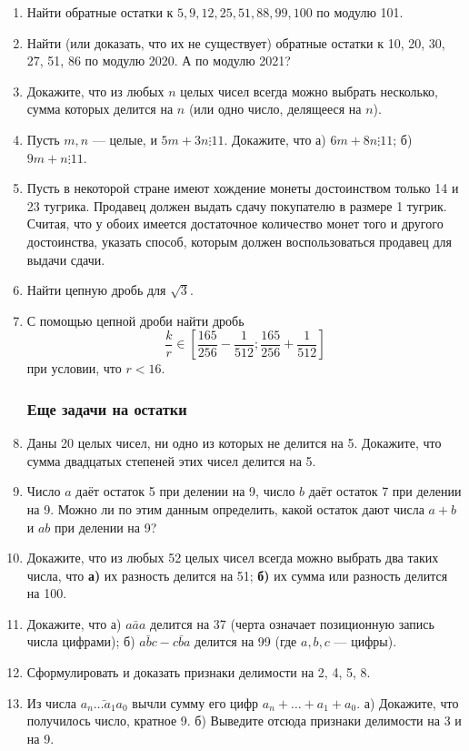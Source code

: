 \begin{enumerate}
\item Найти обратные остатки к $5,9,12,25,51,88,99,100$ по модулю 101.
\item Найти (или доказать, что их не существует) обратные остатки к 10, 20, 30, 27, 51, 86 по модулю 2020. А по модулю 2021?
\item Докажите, что из любых $n$ целых чисел всегда можно выбрать
несколько, сумма которых делится на $n$ (или одно число, делящееся
на $n$).
\item Пусть $m,n$ --- целые, и $5m+3n\vdots 11$. Докажите, что а) $6m+8n\vdots 11$; б) $9m+n\vdots 11$.
\item Пусть в некоторой стране имеют хождение монеты достоинством только 14 и 23 тугрика. Продавец должен выдать сдачу покупателю в размере 1 тугрик. Считая, что у обоих имеется достаточное количество монет того и другого достоинства, указать способ, которым должен воспользоваться продавец для выдачи сдачи.
\item Найти цепную дробь для $\sqrt 3$.

\item С помощью цепной дроби найти дробь
$$
\frac{k}{r} \in \left[\frac{165}{256}-\frac{1}{512};\frac{165}{256}+\frac{1}{512}\right]
$$
при условии, что $r<16$.

\subsubsection*{Еще задачи на остатки}
\item Даны 20 целых чисел, ни одно из которых не делится на 5. Докажите, что сумма двадцатых
степеней этих чисел делится на 5.
\item Число $a$ даёт остаток 5 при делении на 9, число $b$ даёт остаток
7 при делении на 9. Можно ли по этим данным определить, какой
остаток дают числа $a + b$ и $ab$ при делении на 9?
\item Докажите, что из любых 52 целых чисел всегда можно выбрать два таких числа, что
\textbf{а)} их разность делится на 51; \textbf{б)} их сумма или разность делится на 100.
\item Докажите, что а) $\bar{aaa}$ делится на 37 (черта означает позиционную запись числа цифрами); б) $\bar{abc}-\bar{cba}$ делится на 99 (где $a,b,c$ --- цифры).
\item Сформулировать и доказать признаки делимости на 2, 4, 5, 8.
\item Из числа $\bar{a_n\dots a_1a_0}$ вычли сумму его цифр $a_n+\dots+a_1+a_0$. а) Докажите, что получилось число, кратное 9. б) Выведите отсюда признаки делимости на 3 и на 9.



\end{enumerate}
